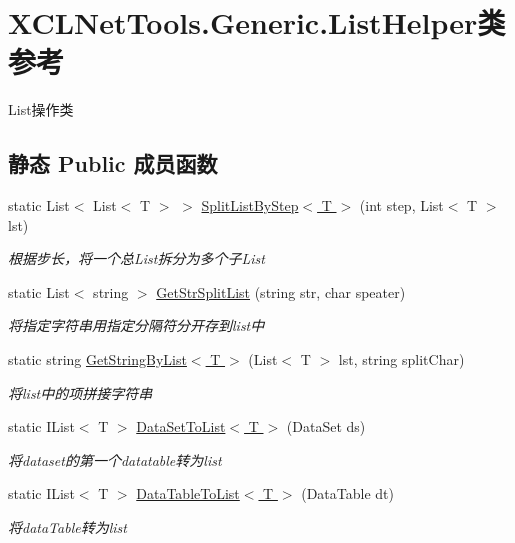 \hypertarget{class_x_c_l_net_tools_1_1_generic_1_1_list_helper}{\section{X\-C\-L\-Net\-Tools.\-Generic.\-List\-Helper类 参考}
\label{class_x_c_l_net_tools_1_1_generic_1_1_list_helper}
}


List操作类  


\subsection*{静态 Public 成员函数}
\begin{DoxyCompactItemize}
\item 
static List$<$ List$<$ T $>$ $>$ \hyperlink{class_x_c_l_net_tools_1_1_generic_1_1_list_helper_a38adb871b8752fb797795645625b7b4f}{Split\-List\-By\-Step$<$ T $>$} (int step, List$<$ T $>$ lst)
\begin{DoxyCompactList}\small\item\em 根据步长，将一个总\-List拆分为多个子\-List \end{DoxyCompactList}\item 
static List$<$ string $>$ \hyperlink{class_x_c_l_net_tools_1_1_generic_1_1_list_helper_a3225ddcbde7d47ccef1ab295ebbd2f1d}{Get\-Str\-Split\-List} (string str, char speater)
\begin{DoxyCompactList}\small\item\em 将指定字符串用指定分隔符分开存到list中 \end{DoxyCompactList}\item 
static string \hyperlink{class_x_c_l_net_tools_1_1_generic_1_1_list_helper_a02b07a0f7a7d4506c358650ba010f7d9}{Get\-String\-By\-List$<$ T $>$} (List$<$ T $>$ lst, string split\-Char)
\begin{DoxyCompactList}\small\item\em 将list中的项拼接字符串 \end{DoxyCompactList}\item 
static I\-List$<$ T $>$ \hyperlink{class_x_c_l_net_tools_1_1_generic_1_1_list_helper_adfbf950f29de90bc153e38c88437041a}{Data\-Set\-To\-List$<$ T $>$} (Data\-Set ds)
\begin{DoxyCompactList}\small\item\em 将dataset的第一个datatable转为list \end{DoxyCompactList}\item 
static I\-List$<$ T $>$ \hyperlink{class_x_c_l_net_tools_1_1_generic_1_1_list_helper_aa1d5d2843b5a105edf4eb8c160fcd016}{Data\-Table\-To\-List$<$ T $>$} (Data\-Table dt)
\begin{DoxyCompactList}\small\item\em 将data\-Table转为list \end{DoxyCompactList}\end{DoxyCompactItemize}


